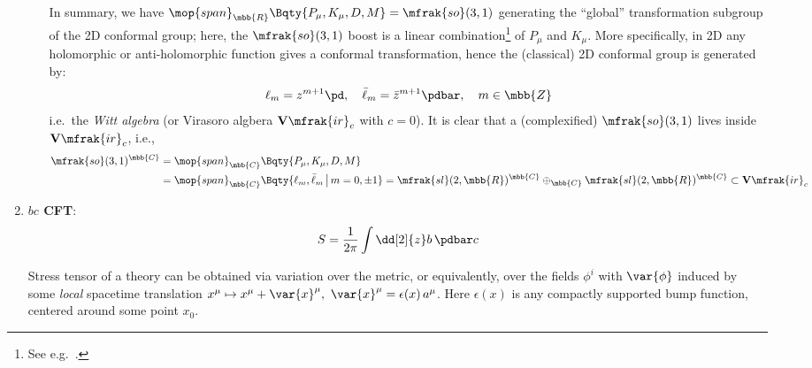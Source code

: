 \documentclass[a4paper,10pt]{article}
\newcommand{\Vir}{\mathbf{V}\mfrak{ir}}
\begin{document}
\begin{enumerate}
\begin{enumerate}
	In summary, we have $
		\mop{span}_\mbb{R}\Bqty{
			P_\mu, K_\mu, D, M
		} = \mfrak{so}(3,1)
	$ generating the ``global'' transformation subgroup of the 2D conformal group; here, the $\mfrak{so}(3,1)$ boost is a linear combination\footnote{
		See e.g.\ . 
	} of $P_\mu$ and $K_\mu$. More specifically, in 2D any holomorphic or anti-holomorphic function gives a conformal transformation, hence the (classical) 2D conformal group is generated by:
	\begin{equation}
		\ell_m = z^{m+1} \pd,\quad
		\bar{\ell}_m = \bar{z}^{m+1} \pdbar,\quad
		m\in\mbb{Z}
	\end{equation}
	i.e.\ the \textit{Witt algebra} (or Virasoro algbera $\Vir_c$ with $c = 0$). It is clear that a (complexified) $\mfrak{so}(3,1)$ lives inside $\Vir_c$, i.e.,
	\begin{equation}
	\begin{aligned}
		\mfrak{so}(3,1)^\mbb{C}
		&= \mop{span}_\mbb{C}\Bqty{
			P_\mu, K_\mu, D, M
		} \\
		&= \mop{span}_\mbb{C}\Bqty{
			\ell_m,\bar{\ell}_m
			\,\big|\, m = 0,\pm 1
		}
		= \mfrak{sl}(2,\mbb{R})^\mbb{C}
			\oplus_\mbb{C}
			\mfrak{sl}(2,\mbb{R})^\mbb{C}
		\subset \Vir_{c}
	\end{aligned}
	\end{equation}
	\end{enumerate}
	\vspace{-1.2\baselineskip}
	
	\qedfull
	
	\item \textbf{$bc$ CFT}:
	\begin{equation}
		S = \frac{1}{2\pi}
			\int \dd[2]{z} b\,\pdbar c
	\end{equation}
	
	Stress tensor of a theory can be obtained via variation over the metric, or equivalently, over the fields $\phi^i$ with $\var{\phi}$ induced by some \textit{local} spacetime translation $
		x^\mu\mapsto x^\mu + \var{x}^\mu,\ %
		\var{x}^\mu = \epsilon(x)\,a^\mu
	$. Here $\epsilon(x)$ is any compactly supported bump function, centered around some point $x_0$. 
	

\end{enumerate}
\end{document}
